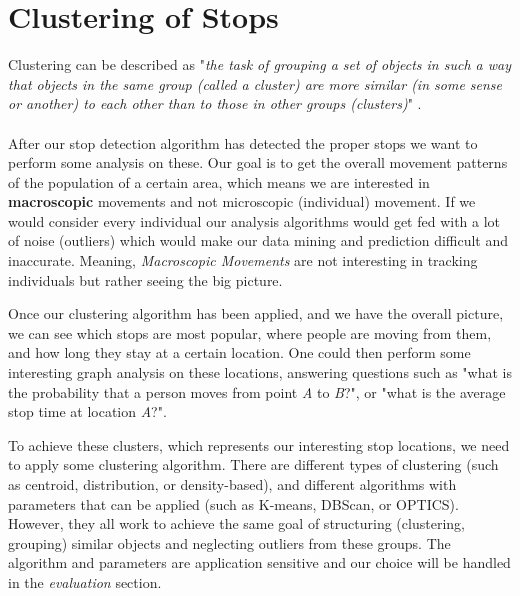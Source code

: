 \section{Clustering of Stops}

Clustering can be described as "\textit{the task of grouping a set of objects in such a way that objects in the same group (called a cluster) are more similar (in some sense or another) to each other than to those in other groups (clusters)}" \cite{clustering}. 
\\\\
After our stop detection algorithm has detected the proper stops we want to perform some analysis on these. Our goal is to get the overall movement patterns of the population of a certain area, which means we are interested in \textbf{macroscopic} movements and not microscopic (individual) movement. If we would consider every individual our analysis algorithms would get fed with a lot of noise (outliers) which would make our data mining and prediction difficult and inaccurate. Meaning, \textit{Macroscopic Movements} are not interesting in tracking individuals but rather seeing the big picture.

 Once our clustering algorithm has been applied, and we have the overall picture, we can see which stops are most popular, where people are moving from them, and how long they stay at a certain location. One could then perform some interesting graph analysis on these locations, answering questions such as "what is the probability that a person moves from point \textit{A} to \textit{B}?", or "what is the average stop time at location \textit{A}?". 
 
 To achieve these clusters, which represents our interesting stop locations, we need to apply some clustering algorithm. There are different types of clustering (such as centroid, distribution, or density-based), and different algorithms with parameters that can be applied (such as K-means, DBScan, or OPTICS). However, they all work to achieve the same goal of structuring (clustering, grouping) similar objects and neglecting outliers from these groups. The algorithm and parameters are application sensitive and our choice will be handled in the \textit{evaluation} section.

